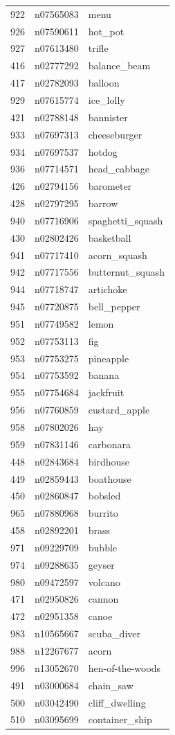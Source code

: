 \begin{table}
\begin{tabular}{cll}
922 & n07565083 & menu \\
926 & n07590611 & hot_pot \\
927 & n07613480 & trifle \\
416 & n02777292 & balance_beam \\
417 & n02782093 & balloon \\
929 & n07615774 & ice_lolly \\
421 & n02788148 & bannister \\
933 & n07697313 & cheeseburger \\
934 & n07697537 & hotdog \\
936 & n07714571 & head_cabbage \\
426 & n02794156 & barometer \\
428 & n02797295 & barrow \\
940 & n07716906 & spaghetti_squash \\
430 & n02802426 & basketball \\
941 & n07717410 & acorn_squash \\
942 & n07717556 & butternut_squash \\
944 & n07718747 & artichoke \\
945 & n07720875 & bell_pepper \\
951 & n07749582 & lemon \\
952 & n07753113 & fig \\
953 & n07753275 & pineapple \\
954 & n07753592 & banana \\
955 & n07754684 & jackfruit \\
956 & n07760859 & custard_apple \\
958 & n07802026 & hay \\
959 & n07831146 & carbonara \\
448 & n02843684 & birdhouse \\
449 & n02859443 & boathouse \\
450 & n02860847 & bobsled \\
965 & n07880968 & burrito \\
458 & n02892201 & brass \\
971 & n09229709 & bubble \\
974 & n09288635 & geyser \\
980 & n09472597 & volcano \\
471 & n02950826 & cannon \\
472 & n02951358 & canoe \\
983 & n10565667 & scuba_diver \\
988 & n12267677 & acorn \\
996 & n13052670 & hen-of-the-woods \\
491 & n03000684 & chain_saw \\
500 & n03042490 & cliff_dwelling \\
510 & n03095699 & container_ship \\
\bottomrule
\end{tabular}
\end{table}
